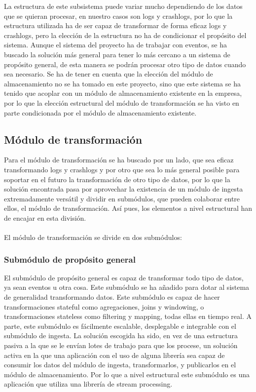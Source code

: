 La estructura de este subsistema puede variar mucho dependiendo de los datos que se quieran procesar, en nuestro casos son logs y crashlogs, por lo que la estructura utilizada ha de ser capaz de transformar de forma eficaz logs y crashlogs, pero la elección de la estructura no ha de condicionar el propósito del sistema. Aunque el sistema del proyecto ha de trabajar con eventos, se ha buscado la solución más general para tener lo más cercano a un sistema de propósito general, de esta manera se podrán procesar otro tipo de datos cuando sea necesario. Se ha de tener en cuenta que la elección del módulo de almacenamiento no se ha tomado en este proyecto, sino que este sistema se ha tenido que acoplar con un módulo de almacenamiento existente en la empresa, por lo que la elección estructural del módulo de transformación se ha visto en parte condicionada por el módulo de almacenamiento existente.


\subsection{Módulo de transformación}

Para el módulo de transformación se ha buscado por un lado, que sea eficaz transformando logs y crashlogs y por otro que sea lo más general posible para soportar en el futuro la transformación de otro tipo de datos, por lo que la solución encontrada pasa por aprovechar la existencia de un módulo de ingesta extremadamente versátil y dividir en submódulos, que pueden colaborar entre ellos, el módulo de transformación. Así pues, los elementos a nivel estructural han de encajar en esta división.
\\\\
El módulo de transformación se divide en dos submódulos:

\subsubsection{Submódulo de propósito general}
El submódulo de propósito general es capaz de transformar todo tipo de datos, ya sean eventos u otra cosa. Este submódulo se ha añadido para dotar al sistema de generalidad transformando datos. Este submódulo es capaz de hacer transformaciones stateful como agregaciones, joins y windowing, o transformaciones stateless como filtering y mapping, todas ellas en tiempo real. A parte, este submódulo es fácilmente escalable, desplegable e integrable con el submódulo de ingesta. La solución escogida ha sido, en vez de una estructura pasiva a la que se le envían lotes de trabajo para que los procese, un solución activa en la que una aplicación con el uso de alguna librería sea capaz de consumir los datos del módulo de ingesta, transformarlos, y publicarlos en el módulo de almacenamiento. Por lo que a nivel estructural este submódulo es una aplicación que utiliza una librería de stream processing.

